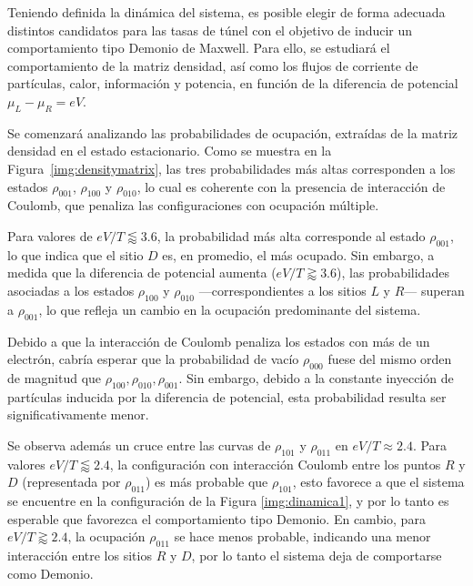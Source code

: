 
Teniendo definida la dinámica del sistema, es posible elegir de forma adecuada distintos candidatos para las tasas de túnel con el objetivo de inducir un comportamiento tipo Demonio de Maxwell. Para ello, se estudiará el comportamiento de la matriz densidad, así como los flujos de corriente de partículas, calor, información y potencia, en función de la diferencia de potencial $\mu_{L} - \mu_{R} = eV$.

Se comenzará analizando las probabilidades de ocupación, extraídas de la matriz densidad en el estado estacionario. Como se muestra en la Figura~\ref{img:densitymatrix}, las tres probabilidades más altas corresponden a los estados $\rho_{001}$, $\rho_{100}$ y $\rho_{010}$, lo cual es coherente con la presencia de interacción de Coulomb, que penaliza las configuraciones con ocupación múltiple.

Para valores de $eV/T \lessapprox 3.6$, la probabilidad más alta corresponde al estado $\rho_{001}$, lo que indica que el sitio $D$ es, en promedio, el más ocupado. Sin embargo, a medida que la diferencia de potencial aumenta ($eV/T \gtrapprox 3.6$), las probabilidades asociadas a los estados $\rho_{100}$ y $\rho_{010}$ —correspondientes a los sitios $L$ y $R$— superan a $\rho_{001}$, lo que refleja un cambio en la ocupación predominante del sistema.

Debido a que la interacción de Coulomb penaliza los estados con más de un electrón, cabría esperar que la probabilidad de vacío $\rho_{000}$ fuese del mismo orden de magnitud que $\rho_{100},\rho_{010},\rho_{001}$. Sin embargo, debido a la constante inyección de partículas inducida por la diferencia de potencial, esta probabilidad resulta ser significativamente menor. 

Se observa además un cruce entre las curvas de $\rho_{101}$ y $\rho_{011}$ en $eV/T \approx 2.4$. Para valores $eV/T \lessapprox 2.4$, la configuración con interacción Coulomb entre los puntos $R$ y $D$ (representada por $\rho_{011}$) es más probable que $\rho_{101}$, esto favorece a que el sistema se encuentre en la configuración de la Figura \ref{img:dinamica1}, y por lo tanto es esperable que favorezca el comportamiento tipo Demonio. En cambio, para $eV/T \gtrapprox 2.4$, la ocupación $\rho_{011}$ se hace menos probable, indicando una menor interacción entre los sitios $R$ y $D$, por lo tanto el sistema deja de comportarse como Demonio.


